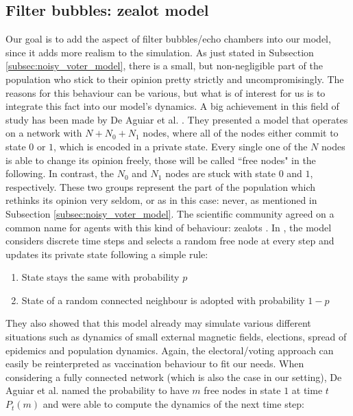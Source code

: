 \documentclass[12pt,a4paper,twoside]{article}
\begin{document}
\subsection{Filter bubbles: zealot model}
Our goal is to add the aspect of filter bubbles/echo chambers into our model, since it adds more realism to the simulation. As just stated in Subsection \ref{subsec:noisy_voter_model}, there is a small, but non-negligible part of the population who stick to their opinion pretty strictly and uncompromisingly. The reasons for this behaviour can be various, but what is of interest for us is to integrate this fact into our model's dynamics. A big achievement in this field of study has been made by De Aguiar et al. \cite{Aguiar2011, Chinellato2015, Braha2017}. They presented a model that operates on a network with $N + N_0 + N_1$ nodes, where all of the nodes either commit to state $0$ or $1$, which is encoded in a private state. Every single one of the $N$ nodes is able to change its opinion freely, those will be called ``free nodes" in the following. In contrast, the $N_0$ and $N_1$ nodes are stuck with state $0$ and $1$, respectively. These two groups represent the part of the population which rethinks its opinion very seldom, or as in this case: never, as mentioned in Subsection \ref{subsec:noisy_voter_model}. The scientific community agreed on a common name for agents with this kind of behaviour: zealots \cite{Mobilia2003, Chinellato2015, Braha2017}. In \cite{Chinellato2015}, the model considers discrete time steps and selects a random free node at every step and updates its private state following a simple rule:
\begin{enumerate}\label{rule:chinellato_update}
	\item State stays the same with probability $p$
	\item State of a random connected neighbour is adopted with probability $1-p$
\end{enumerate}
They also showed that this model already may simulate various different situations such as dynamics of small external magnetic fields, elections, spread of epidemics and population dynamics. Again, the electoral/voting approach can easily be reinterpreted as vaccination behaviour to fit our needs. When considering a fully connected network (which is also the case in our setting), De Aguiar et al. named the probability to have $m$ free nodes in state $1$ at time $t$ $P_t\left(m\right)$ and were able to compute the dynamics of the next time step:
\end{document}
